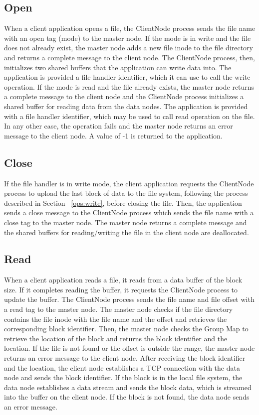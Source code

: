\documentclass[11pt,twocolumn]{article}
\begin{document}
\subsection{Open}\label{ops:open}
When a client application opens a file, the ClientNode process sends the file name with an open tag (mode) to the master node. If the mode is in write and the file does not already exist, the master node adds a new file inode to the file directory and returns a complete message to the client node. The ClientNode process, then, initializes two shared buffers that the application can write data into. The application is provided a file handler identifier, which it can use to call the write operation. If the mode is read and the file already exists, the master node returns a complete message to the client node and the ClientNode process initializes a shared buffer for reading data from the data nodes. The application is provided with a file handler identifier, which may be used to call read operation on the file. In any other case, the operation fails and the master node returns an error message to the client node. A value of -1 is returned to the application. 

\subsection{Close}\label{ops:close}
If the file handler is in write mode, the client application requests the ClientNode process to upload the last block of data to the file system, following the process described in Section ~\ref{ops:write}, before closing the file. Then, the application sends a close message to the ClientNode process which sends the file name with a close tag to the master node. The master node returns a complete message and the shared buffers for reading/writing the file in the client node are deallocated.  


\subsection{Read}\label{ops:read}
When a client application reads a file, it reads from a data buffer of the block size. If it completes reading the buffer, it requests the ClientNode process to update the buffer. The ClientNode process sends the file name and file offset with a read tag to the master node. The master node checks if the file directory contains the file inode with the file name and the offset and retrieves the corresponding block identifier. Then, the master node checks the Group Map to retrieve the location of the block and returns the block identifier and the location. If the file is not found or the offset is outside the range, the master node returns an error message to the client node. After receiving the block identifier and the location, the client node establishes a TCP connection with the data node and sends the block identifier. If the block is in the local file system, the data node establishes a data stream and sends the block data, which is streamed into the buffer on the client node. If the block is not found, the data node sends an error message.  
\end{document}
